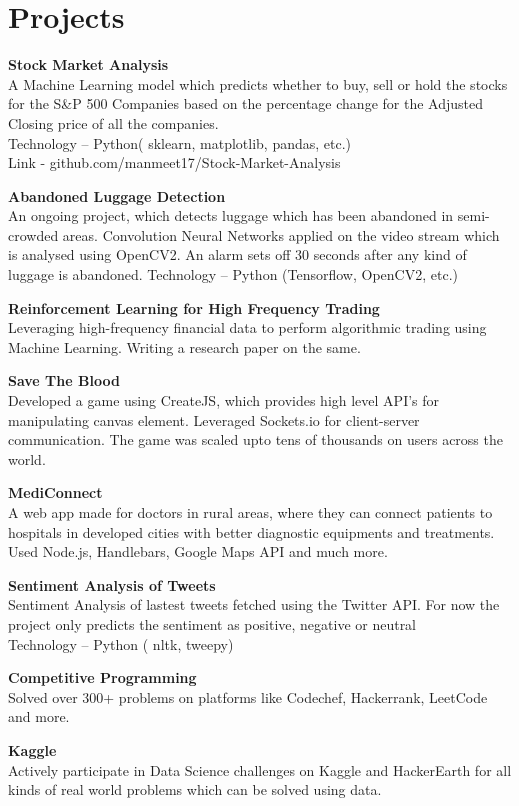 \documentclass[a4paper,10pt]{article}
\begin{document}
\section{Projects}
\begin{flushleft}
\textbf{Stock Market Analysis} \\
A Machine Learning model which predicts whether to buy, sell or hold the stocks for the S\&P 500 Companies based on the percentage change for the Adjusted Closing price of all the companies. \\ 
Technology – Python( sklearn, matplotlib, pandas, etc.) \\
Link - github.com/manmeet17/Stock-Market-Analysis \bigskip

\textbf{Abandoned Luggage Detection} \\
An ongoing project, which detects luggage which has been abandoned in semi-crowded areas. Convolution Neural Networks applied on the video stream which is analysed using OpenCV2. An alarm sets off 30 seconds after any kind of luggage is abandoned.
Technology – Python (Tensorflow, OpenCV2, etc.) \bigskip

\textbf{Reinforcement Learning for High Frequency Trading} \\
Leveraging high-frequency financial data to perform algorithmic trading using Machine Learning. Writing a research paper on the same. \medskip

\textbf{Save The Blood} \\ 
Developed a game using CreateJS, which provides high level API's for manipulating canvas element. Leveraged Sockets.io for client-server communication. The game was scaled upto tens of thousands on users across the world. \bigskip

\textbf{MediConnect} \\
A web app made for doctors in rural areas, where they can connect patients to 
hospitals in developed cities with better diagnostic equipments and treatments. Used Node.js, Handlebars, Google Maps API and much more. \bigskip

\textbf{Sentiment Analysis of Tweets} \\
Sentiment Analysis of lastest tweets fetched using the Twitter API. For now the project only predicts the sentiment as positive, negative or neutral \\
Technology – Python ( nltk, tweepy) \bigskip

\textbf{Competitive Programming} \\
Solved over 300+ problems on platforms like Codechef, Hackerrank, LeetCode and more.
\bigskip

\textbf{Kaggle} \\
Actively participate in Data Science challenges on Kaggle and HackerEarth for all kinds of real world problems which can be solved using data. 
\end{flushleft}
\end{document}
